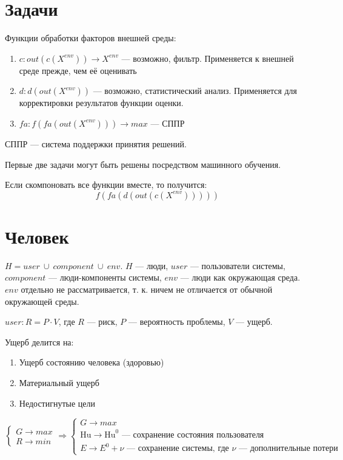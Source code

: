 \documentclass[12pt]{article}
\begin{document}
\begin{sloppypar}
    \section{Задачи}

    Функции обработки факторов внешней среды:
    \begin{enumerate}
        \item $c: out(c(X^{env})) \rightarrow X^{env}$ — возможно, фильтр. Применяется к внешней среде прежде, чем её оценивать
        \item $d : d(out(X^{env}))$ — возможно, статистический анализ. Применяется для корректировки результатов функции оценки.
        \item $fa : f(fa(out(X^{env}))) \rightarrow max$ — СППР
    \end{enumerate}

    СППР — система поддержки принятия решений.

    Первые две задачи могут быть решены посредством машинного обучения.

    Если скомпоновать все функции вместе, то получится:
    \[ f(fa(d(out(c(X^{env}))))) \]

    \section{Человек}

    $H = user \ \cup \ component \ \cup \ env$. $H$ — люди, $user$ — пользователи системы, $component$ — люди-компоненты системы, $env$ — люди как окружающая среда. $env$ отдельно не рассматривается, т. к. ничем не отличается от обычной окружающей среды.

    $user : R = P \cdot V$, где $R$ — риск, $P$ — вероятность проблемы, $V$ — ущерб.

    Ущерб делится на:
    \begin{enumerate}
        \item Ущерб состоянию человека (здоровью)
        \item Материальный ущерб
        \item Недостигнутые цели
    \end{enumerate}

    $\begin{cases}
            G \rightarrow max \\
            R \rightarrow min
        \end{cases}\Rightarrow
        \begin{cases}
            G \rightarrow max                                                             \\
            \text{Hu} \rightarrow \text{Hu}^0 \text{ — сохранение состояния пользователя} \\
            E \rightarrow E^0 + \nu \text{ — сохранение системы, где $\nu$ — дополнительные потери}
        \end{cases}
    $


\end{sloppypar}
\end{document}
